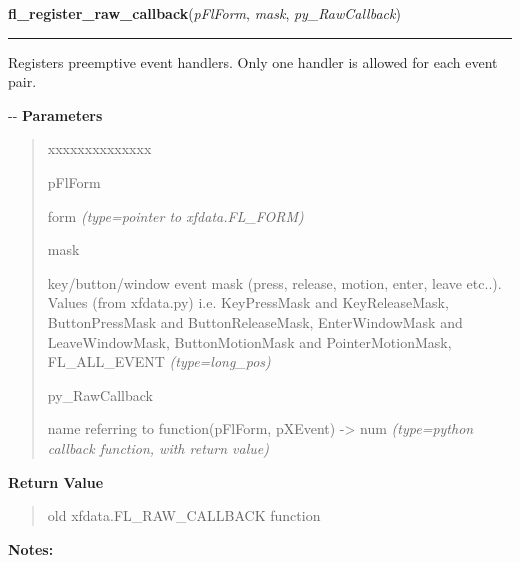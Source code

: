 \hspace{.8\funcindent}\begin{boxedminipage}{\funcwidth}

    \raggedright \textbf{fl\_register\_raw\_callback}(\textit{pFlForm}, \textit{mask}, \textit{py\_RawCallback})

    \vspace{-1.5ex}

    \rule{\textwidth}{0.5\fboxrule}
\setlength{\parskip}{2ex}

Registers preemptive event handlers. Only one handler is allowed
for each event pair.

-{}-
\setlength{\parskip}{1ex}
      \textbf{Parameters}
      \vspace{-1ex}

      \begin{quote}
        \begin{Ventry}{xxxxxxxxxxxxxx}

          \item[pFlForm]


form
            {\it (type=pointer to xfdata.FL\_FORM)}

          \item[mask]


key/button/window event mask (press, release, motion, enter, leave
etc..). Values (from xfdata.py) i.e. KeyPressMask and KeyReleaseMask,
ButtonPressMask and ButtonReleaseMask, EnterWindowMask and
LeaveWindowMask, ButtonMotionMask and PointerMotionMask, FL\_ALL\_EVENT
            {\it (type=long\_pos)}

          \item[py\_RawCallback]


name referring to function(pFlForm, pXEvent) -> num
            {\it (type=python callback function, with return value)}

        \end{Ventry}

      \end{quote}

      \textbf{Return Value}
    \vspace{-1ex}

      \begin{quote}

old xfdata.FL\_RAW\_CALLBACK function
      \end{quote}

\textbf{Notes:}
\begin{quote}
  \begin{itemize}


\end{itemize}
\end{quote}
\end{boxedminipage}
